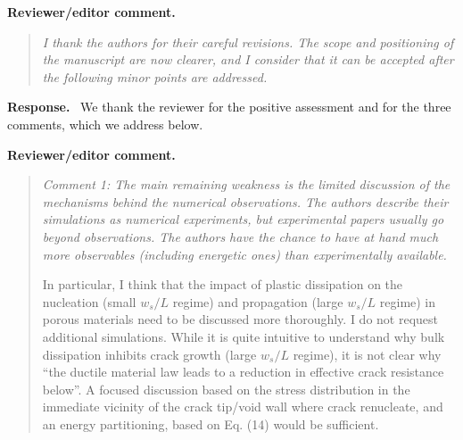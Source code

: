 \documentclass[pdflatex,sn-mathphys-num]{sn-jnl}
\newenvironment{reviewercomment}
  {\par\noindent\textbf{Reviewer/editor comment.}\begin{quote}\itshape}
  {\end{quote}}
\newenvironment{response}
  {\par\noindent\textbf{Response.}\ }
  {\par}
\begin{document}
\begin{reviewercomment}
I thank the authors for their careful revisions. The scope and positioning of the manuscript are now clearer, and I
consider that it can be accepted after the following minor points are addressed.
\end{reviewercomment}

\begin{response}
We thank the reviewer for the positive assessment and for the three comments, which we address below.
\end{response}

\begin{reviewercomment}
Comment 1: The main remaining weakness is the limited discussion of the mechanisms behind the numerical observations.
The authors describe their simulations as numerical experiments, but experimental papers usually go beyond
observations. The authors have the chance to have at hand much more observables (including energetic ones) than
experimentally available.

In particular, I think that the impact of plastic dissipation on the nucleation (small $w_s/L$ regime) and propagation
(large $w_s/L$ regime) in porous materials need to be discussed more thoroughly. I do not request additional
simulations. While it is quite intuitive to understand why bulk dissipation inhibits crack growth (large $w_s/L$
regime), it is not clear why ``the ductile material law leads to a reduction in effective crack resistance below''. A
focused discussion based on the stress distribution in the immediate vicinity of the crack tip/void wall where crack
renucleate, and an energy partitioning, based on Eq. (14) would be sufficient.
\end{reviewercomment}
\end{document}
